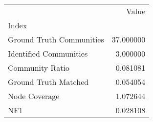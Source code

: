 \begin{tabular}{lr}
\toprule
{} &      Value \\
Index                    &            \\
\midrule
Ground Truth Communities &  37.000000 \\
Identified Communities   &   3.000000 \\
Community Ratio          &   0.081081 \\
Ground Truth Matched     &   0.054054 \\
Node Coverage            &   1.072644 \\
NF1                      &   0.028108 \\
\bottomrule
\end{tabular}
